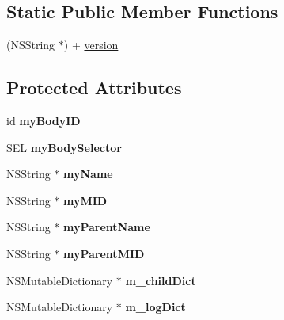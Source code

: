 \subsection*{Static Public Member Functions}
\begin{DoxyCompactItemize}
\item 
(NSString $\ast$) + \hyperlink{interface_messenger_system_aebad51a1ea3a010f1bb20d2f3327adcc}{version}
\end{DoxyCompactItemize}
\subsection*{Protected Attributes}
\begin{DoxyCompactItemize}
\item 
\hypertarget{interface_messenger_system_a90f9745297d9d34f403579d395744a71}{
id {\bfseries myBodyID}}
\label{interface_messenger_system_a90f9745297d9d34f403579d395744a71}

\item 
\hypertarget{interface_messenger_system_a469a5e545f12673594bc0117c8441068}{
SEL {\bfseries myBodySelector}}
\label{interface_messenger_system_a469a5e545f12673594bc0117c8441068}

\item 
\hypertarget{interface_messenger_system_aa6f745c063b7432f33409c4e74fad099}{
NSString $\ast$ {\bfseries myName}}
\label{interface_messenger_system_aa6f745c063b7432f33409c4e74fad099}

\item 
\hypertarget{interface_messenger_system_ab0873dccec01721962a9feda60f881e9}{
NSString $\ast$ {\bfseries myMID}}
\label{interface_messenger_system_ab0873dccec01721962a9feda60f881e9}

\item 
\hypertarget{interface_messenger_system_a768d13ac0ab2689e095bcae527cb3c1b}{
NSString $\ast$ {\bfseries myParentName}}
\label{interface_messenger_system_a768d13ac0ab2689e095bcae527cb3c1b}

\item 
\hypertarget{interface_messenger_system_a160a088edbe00c0a701b5c51a36203d3}{
NSString $\ast$ {\bfseries myParentMID}}
\label{interface_messenger_system_a160a088edbe00c0a701b5c51a36203d3}

\item 
\hypertarget{interface_messenger_system_a7596fd096f620d0141fac502665dcabf}{
NSMutableDictionary $\ast$ {\bfseries m\_\-childDict}}
\label{interface_messenger_system_a7596fd096f620d0141fac502665dcabf}

\item 
\hypertarget{interface_messenger_system_adf17d60a0ff5e2c21cb2f3717d9b5b55}{
NSMutableDictionary $\ast$ {\bfseries m\_\-logDict}}
\label{interface_messenger_system_adf17d60a0ff5e2c21cb2f3717d9b5b55}

\end{DoxyCompactItemize}


